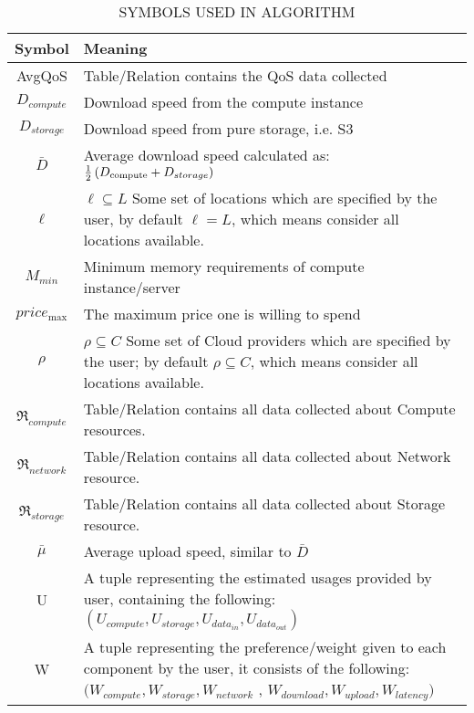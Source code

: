 \documentclass[journal]{IEEEtran}
\begin{document}
\begin{table}[!ht]
\begin{center}\caption{SYMBOLS USED IN ALGORITHM  } \label{table:algo_symbols}
\begin{tabular}{|c|p{6cm}|}
\hline
\textbf{Symbol }&  \textbf{Meaning} \\
\hline AvgQoS &   Table/Relation contains the QoS data collected \\
\hline ${D_{compute}}$ &   Download speed from the compute instance \\
\hline ${D_{storage}}$ &   Download speed from pure storage, i.e. S3 \\
\hline $\bar D$ &   Average download speed calculated as: $\frac{1}{2}\left( {{D_{{\rm{compute}}}} + {D_{storage}}} \right)$ \\
\hline $\ell$ &  
$\ell  \subseteq L$  Some set of locations which are specified by the user, by default 
 $\ell  = L$, which means consider all locations available.
 \\
\hline $M_{min}$ & Minimum memory requirements of compute instance/server  \\
\hline $pric{e_{\max }}$ &   The maximum price one is willing to spend \\
\hline $\rho$ &   
$\rho  \subseteq C$ Some set of  Cloud  providers which are specified by  the user; by
default   $\rho  \subseteq C$, which means consider all locations available. \\
\hline ${\Re _{compute}}$ &  Table/Relation contains all data collected about Compute resources.  \\
\hline ${\Re _{network}}$ &  Table/Relation contains all data collected about Network resource. \\
\hline ${\Re _{storage}}$ & Table/Relation contains all data collected about Storage resource. \\
\hline $\bar \mu $ &   Average upload speed, similar to $\bar D$ \\
\hline U & A tuple representing the estimated usages provided by user, containing the
following: $( U_{compute} , U_{storage} , U_{data_{in}} , U_{data_{out}} )$\\
\hline W & A tuple representing the preference/weight given to each component by the user, it consists of the following: 
$( W_{compute} , W_{storage}, W_{network} $ , $ W_{download} , W_{upload}, W_{latency} )$ \\
\hline
\end{tabular}
\end{center}
\end{table}
\end{document}
